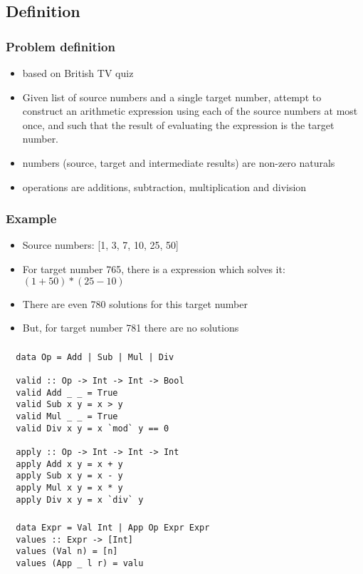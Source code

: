 \documentclass[aspectratio=43]{beamer}
\begin{document}
\subsection{Definition}

\begin{frame}
 \frametitle{Problem definition}
 \begin{itemize}
  \item based on British TV quiz
  \item Given list of source numbers and a single target number, attempt to construct an arithmetic expression using each of the source numbers at most once, and such that the result of evaluating the expression is the target number.
  \item numbers (source, target and intermediate results) are non-zero naturals
  \item operations are additions, subtraction, multiplication and division
 \end{itemize}
\end{frame}

\begin{frame}
 \frametitle{Example}
 \begin{itemize}
  \item Source numbers: [1, 3, 7, 10, 25, 50]
  \item For target number 765, there is a expression which solves it: $(1 + 50)*(25 - 10)$
  \item There are even 780 solutions for this target number
  \item But, for target number 781 there are no solutions
 \end{itemize}
\end{frame}

\begin{frame}[fragile]
 \frametitle{}
 \begin{lstlisting}
  data Op = Add | Sub | Mul | Div
  
  valid :: Op -> Int -> Int -> Bool 
  valid Add _ _ = True
  valid Sub x y = x > y
  valid Mul _ _ = True
  valid Div x y = x `mod` y == 0
  
  apply :: Op -> Int -> Int -> Int
  apply Add x y = x + y
  apply Sub x y = x - y
  apply Mul x y = x * y
  apply Div x y = x `div` y
  \end{lstlisting}
\end{frame}

\begin{frame}[fragile]
 \frametitle{}
 \begin{lstlisting}
  data Expr = Val Int | App Op Expr Expr
  values :: Expr -> [Int]
  values (Val n) = [n]
  values (App _ l r) = valu
 \end{lstlisting}
\end{frame}
\end{document}
